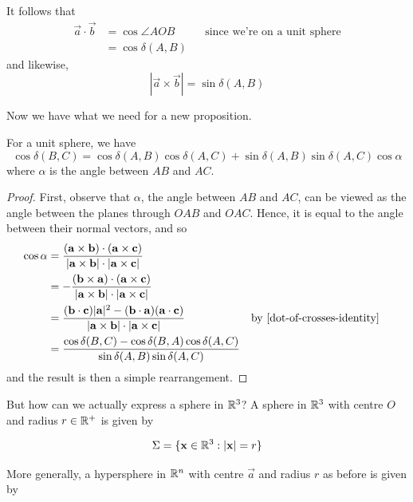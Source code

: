 \documentclass{../../template/note}
\begin{document}
    It follows that
    \begin{align*}
        \vec a \cdot \vec b &= \cos \angle AOB && \text{since we're on a unit sphere} \\
        &= \cos \delta(A, B)
    \end{align*}
    and likewise,
    \[
        |\vec a \times \vec b| = \sin \delta(A, B)
    \]

    Now we have what we need for a new proposition.

    \begin{proposition}
        For a unit sphere, we have
        \[
            \cos \delta(B, C) = \cos \delta(A, B) \cos \delta(A, C) + \sin \delta(A, B) \sin \delta(A, C) \cos \alpha
        \]
        where \(\alpha\) is the angle between \(AB\) and \(AC\).
    \end{proposition}
    
    \begin{proof}
        First, observe that \(\alpha\), the angle between \(AB\) and \(AC\), can be viewed as the angle between the planes through \(OAB\) and \(OAC\). Hence, it is equal to the angle between their normal vectors, and so
        \begin{align*}
            \cos \alpha &= \frac{(\vec a \times \vec b) \cdot (\vec a \times \vec c)}{|\vec a \times \vec b| \cdot |\vec a \times \vec c|} \\
            &= -\frac{(\vec b \times \vec a) \cdot (\vec a \times \vec c)}{|\vec a \times \vec b| \cdot |\vec a \times \vec c|} \\
            &= \frac{(\vec b \cdot \vec c)|\vec a|^2 - (\vec b \cdot \vec a)(\vec a \cdot \vec c)}{|\vec a \times \vec b| \cdot |\vec a \times \vec c|} && \text{by \cref{dot-of-crosses-identity}} \\
            &= \frac{\cos \delta(B, C) - \cos \delta(B, A) \cos \delta(A, C)}{\sin \delta(A, B) \sin \delta(A, C)}
        \end{align*}
        and the result is then a simple rearrangement.
    \end{proof}
    
    But how can we actually express a sphere in \(\mathbb R^3\)? A sphere in \(\mathbb R^3\) with centre \(O\) and radius \(r \in \mathbb R^+\) is given by
    
    \[
        \Sigma = \{\vec x \in \RR^3: |\vec x| = r\}
    \]
    
    More generally, a hypersphere in \(\mathbb R^n\) with centre \(\vec a\) and radius \(r\) as before is given by
\end{document}
